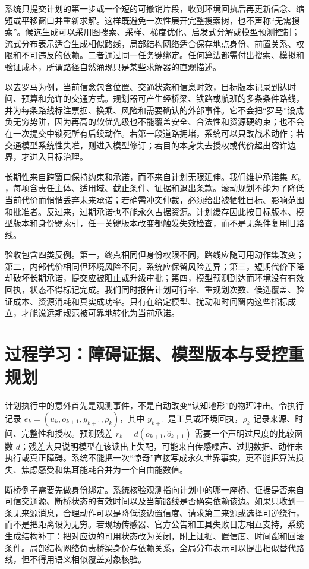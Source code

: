 系统只提交计划的第一步或一个短的可撤销片段，收到环境回执后再更新信念、缩短或平移窗口并重新求解。这样既避免一次性展开完整搜索树，也不声称“无需搜索”。候选生成可以采用图搜索、采样、梯度优化、启发式分解或模型预测控制；流式分布表示适合生成相似路线，局部结构网络适合保存地点身份、前置关系、权限和不可违反的依赖。二者通过同一任务键绑定。任何算法都需付出搜索、模拟和验证成本，所谓路径自然涌现只是某些求解器的直观描述。

以去罗马为例，当前信念包含位置、交通状态和信息时效，目标版本记录到达时间、预算和允许的交通方式。规划器可产生经桥梁、铁路或航班的多条条件路线，并为每条路线标注票据、换乘、风险和需要确认的外部事件。它不会把“罗马”设成负无穷势阱，因为再高的软优先级也不能覆盖安全、合法性和资源硬约束；也不会在一次提交中锁死所有后续动作。若第一段道路拥堵，系统可以只改战术动作；若交通模型系统性失准，则进入模型修订；若目的本身失去授权或代价超出容许边界，才进入目标治理。

长期性来自跨窗口保持约束和承诺，而不来自计划无限延伸。我们维护承诺集 $K_k$，每项含责任主体、适用域、截止条件、证据和退出条款。滚动规划不能为了降低当前代价而悄悄丢弃未来承诺；若确需冲突仲裁，必须给出被牺牲目标、影响范围和批准者。反过来，过期承诺也不能永久占据资源。计划缓存因此按目标版本、模型版本和身份键索引，任一关键版本改变都触发失效检查，而不是无条件复用旧路线。

验收包含四类反例。第一，终点相同但身份权限不同，路线应随可用动作集改变；第二，内部代价相同但环境风险不同，系统应保留风险差异；第三，短期代价下降却破坏长期承诺，提交应被阻止或升级审批；第四，模型预测到达而环境没有有效回执，状态不得标记完成。我们同时报告计划可行率、重规划次数、候选覆盖、验证成本、资源消耗和真实成功率。只有在给定模型、扰动和时间窗内这些指标成立，才能说远期规范被可靠地转化为当前承诺。

\section{过程学习：障碍证据、模型版本与受控重规划}
\label{sec:learning_in_process_cefe}
计划执行中的意外首先是观测事件，不是自动改变“认知地形”的物理冲击。令执行记录 $e_k=(u_k,o_{k+1},y_{k+1},\rho_k)$，其中 $y_{k+1}$ 是工具或环境回执，$\rho_k$ 记录来源、时间、完整性和授权。预测残差 $r_k=d(o_{k+1},\widehat o_{k+1})$ 需要一个声明过尺度的比较函数 $d$；残差大只说明模型在该读出上失配，可能来自传感噪声、过期数据、动作未执行或真正障碍。系统不能把一次“惊奇”直接写成永久世界事实，更不能把算法损失、焦虑感受和焦耳能耗合并为一个自由能数值。

断桥例子需要先做身份绑定。系统核验观测指向计划中的哪一座桥、证据是否来自可信交通源、断桥状态的有效时间以及当前路线是否确实依赖该边。如果只收到一条无来源消息，合理动作可以是降低该边置信度、请求第二来源或选择可逆绕行，而不是把距离设为无穷。若现场传感器、官方公告和工具失败日志相互支持，系统生成结构补丁：把对应边的可用状态改为关闭，附上证据、置信度、时间窗和回滚条件。局部结构网络负责桥梁身份与依赖关系，全局分布表示可以提出相似替代路线，但不得用语义相似覆盖对象核验。

